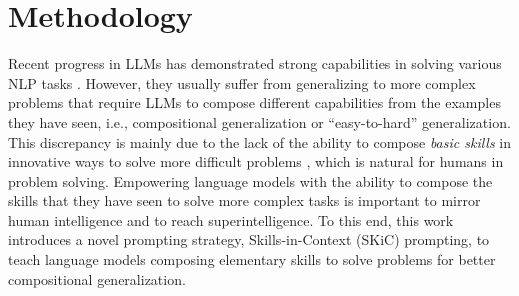\documentclass{article} \usepackage{arxiv}
\begin{document}
 








\section{Methodology}
\label{sec: methodology}














Recent progress in LLMs has demonstrated strong capabilities in solving various NLP tasks \citep{brown2020language, Radford2019LanguageMA, smith2022using, chowdhery2022palm, lewkowycz2022solving, sanh2021multitask, wei2021finetuned, mishra2022cross, chung2022scaling, ouyang2022training}. However, they usually suffer from generalizing to more complex problems that require LLMs to compose different capabilities \citep{zhou2022least} from the examples they have seen, i.e., compositional generalization or ``easy-to-hard'' generalization. This discrepancy is mainly due to the lack of the ability to compose \textit{basic skills} in innovative ways to solve more difficult problems \citep{dziri2023faith}, which is natural for humans in problem solving. Empowering language models with the ability to compose the skills that they have seen to solve more complex tasks is important to mirror human intelligence and to reach superintelligence. To this end, this work introduces a novel prompting strategy, Skills-in-Context (SKiC) prompting, to teach language models composing elementary skills to solve problems for better compositional generalization.
\end{document}
